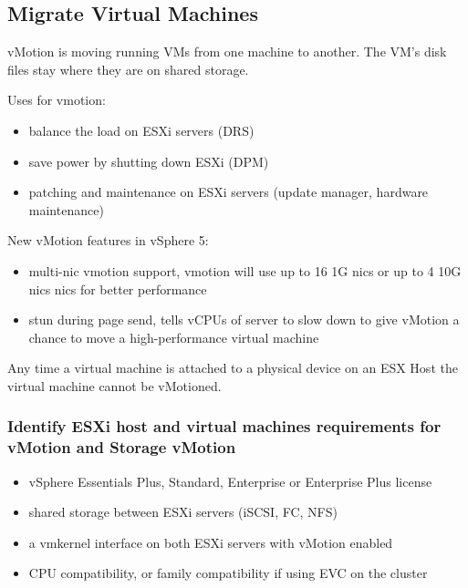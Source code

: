 \subsection{Migrate Virtual Machines}

vMotion is moving running VMs from one machine to another. The VM's disk files
stay where they are on shared storage.

Uses for vmotion:

\begin{itemize}
\item balance the load on ESXi servers (DRS)
\item save power by shutting down ESXi (DPM)
\item patching and maintenance on ESXi servers (update manager, hardware
maintenance)
\end{itemize}

New vMotion features in vSphere 5:

\begin{itemize}

\item multi-nic vmotion support, vmotion will use up to 16 1G nics or up to 4
10G nics nics for better performance

\item stun during page send, tells vCPUs of server to slow down to give
vMotion a chance to move a high-performance virtual machine

\end{itemize}

Any time a virtual machine is attached to a physical device on an ESX Host
the virtual machine cannot be vMotioned.

\subsubsection{Identify ESXi host and virtual machines requirements for vMotion and Storage vMotion}

\begin{itemize}
\item vSphere Essentials Plus, Standard, Enterprise or Enterprise Plus license
\item shared storage between ESXi servers (iSCSI, FC, NFS)
\item a vmkernel interface on both ESXi servers with vMotion enabled
\item CPU compatibility, or family compatibility if using EVC on the cluster
\end{itemize}

